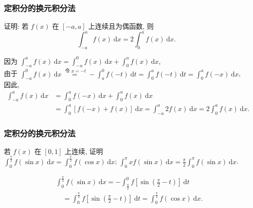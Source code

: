 \documentclass[
10pt,
aspectratio=43,
]{beamer}
\begin{document}
\begin{frame}
	\frametitle{定积分的换元积分法}
	\everymath{\displaystyle}
	\begin{block}{}
		证明: 若 $f(x)$ 在 $[-a, a]$ 上连续且为偶函数, 则
		$$
			\int_{-a}^a f(x) \mathrm{~d} x=2 \int_0^a f(x) \mathrm{~d} x .
		$$
	\end{block}
	\pause
	\begin{exampleblock}{}
		因为 $\int_{-a}^a f(x) \mathrm{~d} x=\int_{-a}^0 f(x) \mathrm{~d} x+\int_0^a f(x) \mathrm{~d} x$,\\\vspace{0.2cm}
		由于 $\int_{-a}^0 f(x) \mathrm{~d} x \stackrel{\text { 令 } x=-t}{=}-\int_a^0 f(-t) \mathrm{~d} t=\int_0^a f(-t) \mathrm{~d} t=\int_0^a f(-x) \mathrm{~d} x$,\\\vspace{0.2cm}
		因此,
		$$
			\begin{aligned}
				\int_{-a}^a f(x) \mathrm{~d} x & =\int_0^a f(-x) \mathrm{~d} x+\int_0^a f(x) \mathrm{~d} x                                            \\
				                               & =\int_0^a[f(-x)+f(x)] \mathrm{~d} x=\int_{-a}^a 2 f(x) \mathrm{~d} x=2 \int_0^a f(x) \mathrm{~d} x .
			\end{aligned}
		$$
	\end{exampleblock}
\end{frame}

\begin{frame}
	\frametitle{定积分的换元积分法}
	\everymath{\displaystyle}
	\begin{block}{}
		若 $f(x)$ 在 $[0,1]$ 上连续, 证明\\\vspace{0.1cm}
		$\int_0^{\frac{\pi}{2}} f(\sin x) \mathrm{~d} x=\int_0^{\frac{\pi}{2}} f(\cos x) \mathrm{~d} x$; $\int_0^\pi x f(\sin x) \mathrm{~d} x=\frac{\pi}{2} \int_0^\pi f(\sin x) \mathrm{~d} x$.
	\end{block}
	\pause
	\begin{exampleblock}{}
		$$
			\begin{aligned}
				 & \int_0^{\frac{\pi}{2}} f(\sin x) \mathrm{~d} x=-\int_{\frac{\pi}{2}}^0 f\left[\sin \left(\frac{\pi}{2}-t\right)\right] \mathrm{~d} t        \\
				 & \quad=\int_0^{\frac{\pi}{2}} f\left[\sin \left(\frac{\pi}{2}-t\right)\right] \mathrm{~d} t=\int_0^{\frac{\pi}{2}} f(\cos x) \mathrm{~d} x .
			\end{aligned}
		$$
	\end{exampleblock}
\end{frame}
\end{document}
